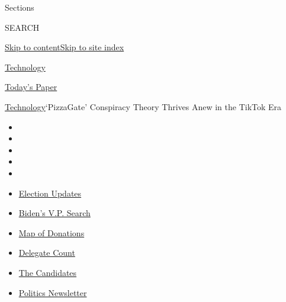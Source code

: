 Sections

SEARCH

\protect\hyperlink{site-content}{Skip to
content}\protect\hyperlink{site-index}{Skip to site index}

\href{https://www.nytimes3xbfgragh.onion/section/technology}{Technology}

\href{https://myaccount.nytimes3xbfgragh.onion/auth/login?response_type=cookie\&client_id=vi}{}

\href{https://www.nytimes3xbfgragh.onion/section/todayspaper}{Today's
Paper}

\href{/section/technology}{Technology}\textbar{}`PizzaGate' Conspiracy
Theory Thrives Anew in the TikTok Era

\begin{itemize}
\item
\item
\item
\item
\item
\end{itemize}

\begin{itemize}
\item
  \href{https://www.nytimes3xbfgragh.onion/2020/07/31/us/elections/biden-vs-trump.html?action=click\&pgtype=Article\&state=default\&region=TOP_BANNER\&context=storylines_menu}{Election
  Updates}
\item
  \href{https://www.nytimes3xbfgragh.onion/article/biden-vice-president-2020.html?action=click\&pgtype=Article\&state=default\&region=TOP_BANNER\&context=storylines_menu}{Biden's
  V.P. Search}
\item
  \href{https://www.nytimes3xbfgragh.onion/interactive/2020/07/24/us/politics/trump-biden-campaign-donors.html?action=click\&pgtype=Article\&state=default\&region=TOP_BANNER\&context=storylines_menu}{Map
  of Donations}
\item
  \href{https://www.nytimes3xbfgragh.onion/interactive/2020/us/elections/delegate-count-primary-results.html?action=click\&pgtype=Article\&state=default\&region=TOP_BANNER\&context=storylines_menu}{Delegate
  Count}
\item
  \href{https://www.nytimes3xbfgragh.onion/interactive/2019/us/politics/2020-presidential-candidates.html?action=click\&pgtype=Article\&state=default\&region=TOP_BANNER\&context=storylines_menu}{The
  Candidates}
\item
  \href{https://www.nytimes3xbfgragh.onion/newsletters/politics?action=click\&pgtype=Article\&state=default\&region=TOP_BANNER\&context=storylines_menu}{Politics
  Newsletter}
\end{itemize}

